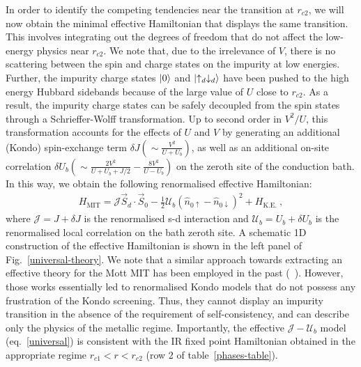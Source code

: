 \documentclass{iopart}
\begin{document}
In order to identify the competing tendencies near the transition at \(r_{c2}\), we will now obtain the minimal effective Hamiltonian that displays the same transition. This involves integrating out the degrees of freedom that do not affect the low-energy physics near \(r_{c2}\).
We note that, due to the irrelevance of \(V\), there is no scattering between the spin and charge states on the impurity at low energies.
Further, the impurity charge states \(\ket{0}\) and \(\ket{\uparrow_d \downarrow_d}\) have been pushed to the high energy Hubbard sidebands because of the large value of \(U\) close to \(r_{c2}\).
As a result, the impurity charge states can be safely decoupled from the spin states through a Schrieffer-Wolff transformation. Up to second order in $V^{2}/U$, this transformation accounts for the effects of \(U\) and \(V\) by generating an additional (Kondo) spin-exchange term \(\delta J \left(\sim \frac{V^2}{U+U_b}\right)\), as well as an additional on-site correlation \(\delta U_b\left(\sim \frac{2V^2}{U+U_b+J/2} - \frac{8V^{2}}{U-U_{b}}\right)\) on the zeroth site of the conduction bath. In this way, we obtain the following renormalised effective Hamiltonian:
\begin{eqnarray}
	\label{universal}
	H_\text{MIT} = \mathcal{J} \vec{S}_d\cdot\vec{S}_0 - \frac{1}{2}\mathcal{U}_b\left(\hat n_{0 \uparrow} - \hat n_{0 \downarrow}\right)^2 + H_\text{K.E.}~,
\end{eqnarray}
where \(\mathcal{J} = J + \delta J\) is the renormalised s-d interaction and \(\mathcal{U}_b = U_b + \delta U_b\) is the renormalised local correlation on the bath zeroth site.
A schematic 1D construction of the effective Hamiltonian is shown in the left panel of Fig.~\eqref{universal-theory}.
We note that a similar approach towards extracting an effective theory for the Mott MIT has been employed in the past (~\cite{moeller_1995,held_2013}). However, those works essentially led to renormalised Kondo models that do not possess any frustration of the Kondo screening. Thus, they cannot display an impurity transition in the absence of the requirement of self-consistency, and can describe only the physics of the metallic regime. Importantly, the effective \(\mathcal{J}-\mathcal{U}_b\) model (eq.~\eqref{universal}) is consistent with the IR fixed point Hamiltonian obtained in the appropriate regime \(r_{c1} < r < r_{c2}\) (row 2 of table~\eqref{phases-table}).
\end{document}
